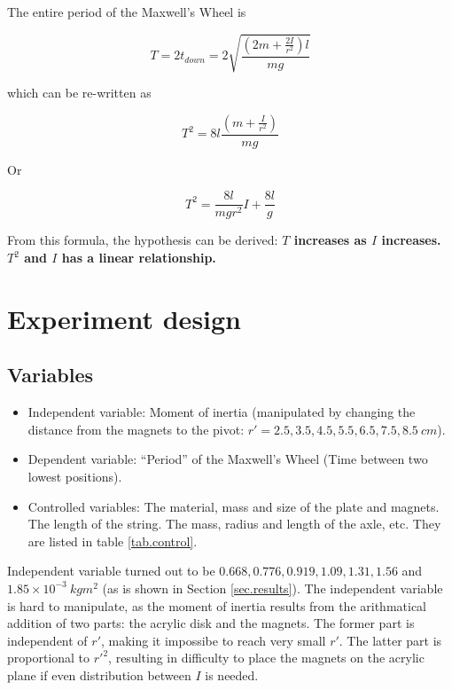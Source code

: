 \documentclass[a4paper]{article}
\begin{document}
The entire period of the Maxwell's Wheel is 

\begin{equation}
    T = 2t_{down} = 2\sqrt{\dfrac{(2m+\frac{2I}{r^2})l}{mg}}
\end{equation}

which can be re-written as 

\begin{equation}
    T^2 = 8l\dfrac{(m+\frac{I}{r^2})}{mg}
\end{equation}

Or

\begin{equation}
    T^2 = \dfrac{8l}{mgr^2} I + \dfrac{8l}{g}
\end{equation}

From this formula, the hypothesis can be derived: \textbf{$T$ increases as $I$ increases. $T^2$ and $I$ has a linear relationship.}

\section{Experiment design}

\subsection{Variables} 

\begin{itemize}
    \item Independent variable: Moment of inertia (manipulated by changing the distance from the magnets to the pivot: $r' = 2.5, 3.5, 4.5, 5.5, 6.5, 7.5, 8.5 \SI{}{cm}$).
    \item Dependent variable: ``Period'' of the Maxwell's Wheel (Time between two lowest positions).
    \item Controlled variables: The material, mass and size of the plate and magnets. The length of the string. The mass, radius and length of the axle, etc. They are listed in table \ref{tab.control}.
\end{itemize}

Independent variable turned out to be $0.668, 0.776, 0.919, 1.09, 1.31, 1.56$ and $1.85 \times 10^{-3}\SI{}{kgm^2}$ (as is shown in Section \ref{sec.results}). The independent variable is hard to manipulate, as the moment of inertia results from the arithmatical addition of two parts: the acrylic disk and the magnets. The former part is independent of $r'$, making it impossibe to reach very small $r'$. The latter part is proportional to $r'^2$, resulting in difficulty to place the magnets on the acrylic plane if even distribution between $I$ is needed. 
\end{document}
